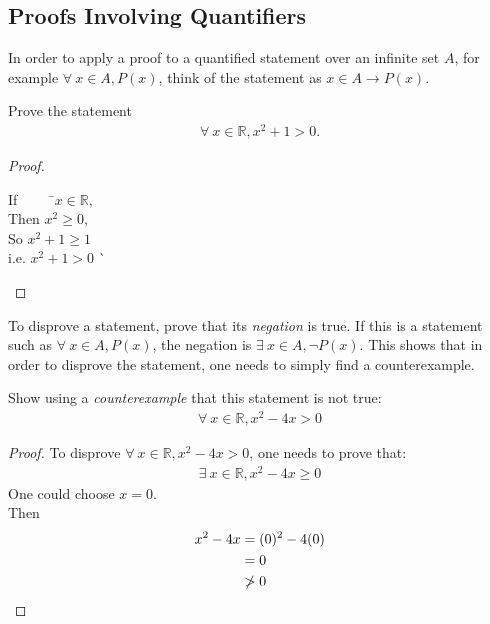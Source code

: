 \documentclass[../notes.tex]{subfiles}
\begin{document}
			\subsection{Proofs Involving Quantifiers}
				In order to apply a proof to a quantified statement over an infinite set $A$, for example $\forall \: x \in A, P(x)$, think of the statement as $x \in A \rightarrow P(x)$.
				\begin{example}
					Prove the statement
					\begin{align*}
						\forall \: x \in \mathbb{R}, x^{2} + 1 > 0.
					\end{align*}
					\begin{proof}
						$ $
						\begin{tabbing}
							If $\qquad$ \=$x \in \mathbb{R}$,\\
							Then \>$x^{2} \geq 0$,\\
							So \> $x^{2} + 1 \geq 1$\\
							i.e. \> $x^{2} + 1 > 0$ \` \qedhere
						\end{tabbing}
					\end{proof}
				\end{example}
				To disprove a statement, prove that its \textit{negation} is true. If this is a statement such as $\forall \: x \in A, P(x)$, the negation is $\exists \: x \in A, \lnot P(x)$. This shows that in order to disprove the statement, one needs to simply find a counterexample.
				\begin{example}
					Show using a \textit{counterexample} that this statement is not true:
					\begin{align*}
						\forall \: x \in \mathbb{R}, x^{2} - 4x > 0
					\end{align*}
					\begin{proof}
						To disprove $\forall \: x \in \mathbb{R}, x^{2} - 4x > 0$, one needs to prove that:
						\begin{align*}
							\exists \: x \in \mathbb{R}, x^{2} - 4x \geq 0
						\end{align*}
						One could choose $x = 0$.\\
						Then \begin{align*}
							x^{2} - 4x &= (0)^{2} - 4(0)\\
							&= 0\\
							& \not > 0 \qedhere
						\end{align*}
					\end{proof}
				\end{example}
			\pagebreak
\end{document}
